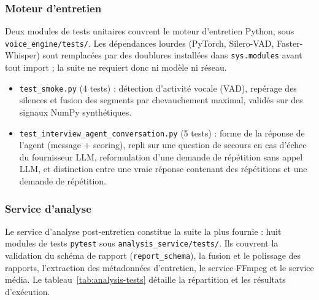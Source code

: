 \subsubsection{Moteur d'entretien}

Deux modules de tests unitaires couvrent le moteur d'entretien Python, sous
\texttt{voice\_engine/tests/}. Les dépendances lourdes (PyTorch, Silero-VAD,
Faster-Whisper) sont remplacées par des doublures installées dans \texttt{sys.modules} avant
tout import ; la suite ne requiert donc ni modèle ni réseau.

\begin{itemize}
  \item \texttt{test\_smoke.py} (4 tests) : détection d'activité vocale (VAD), repérage des
        silences et fusion des segments par chevauchement maximal, validés sur des signaux
        NumPy synthétiques.
  \item \texttt{test\_interview\_agent\_conversation.py} (5 tests) : forme de la réponse de
        l'agent (message + scoring), repli sur une question de secours en cas d'échec du
        fournisseur LLM, reformulation d'une demande de répétition sans appel LLM, et
        distinction entre une vraie réponse contenant des répétitions et une demande de
        répétition.
\end{itemize}

\subsubsection{Service d'analyse}

Le service d'analyse post-entretien constitue la suite la plus fournie : huit modules de tests
\texttt{pytest} sous \texttt{analysis\_service/tests/}. Ils couvrent la validation du schéma de
rapport (\texttt{report\_schema}), la fusion et le polissage des rapports, l'extraction des
métadonnées d'entretien, le service FFmpeg et le service média. Le tableau~\ref{tab:analysis-tests}
détaille la répartition et les résultats d'exécution.

